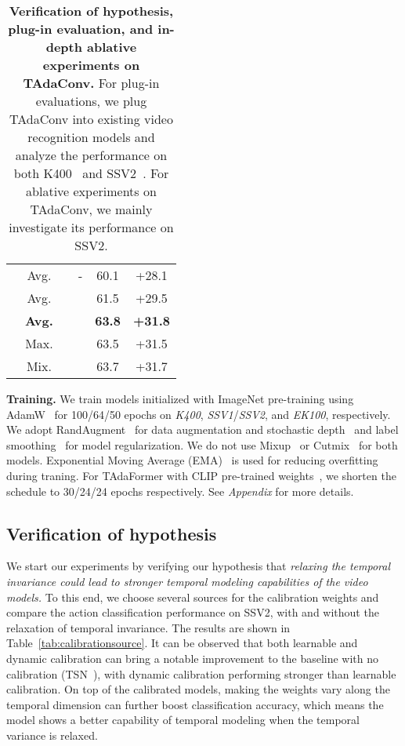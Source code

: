\documentclass[10pt,journal,compsoc]{IEEEtran}
\newcommand{\cmark}{\color{good}\ding{51}}\newcommand{\xmark}{\color{bad}\ding{55}}
\newcommand\graycell[0]{\cellcolor{midgrey}}
\begin{document}
\begin{table*}[]
\begin{subtable}[t]{.48\linewidth}
{\begin{tabular}{cccccc}
    \midrule
    \cmark & Avg. & \xmark & - & 60.1 & +28.1 \\
    \cmark & Avg. & \cmark & \xmark & 61.5 & +29.5\\
    \graycell\cmark & \graycell \bf Avg. & \graycell\cmark & \graycell\cmark & \graycell\bf63.8 & \bf \graycell+31.8 \\
    \midrule
    \cmark & Max. & \cmark & \cmark & 63.5 & +31.5 \\
    \cmark & Mix. & \cmark & \cmark & 63.7 & +31.7\\
    \bottomrule
    \end{tabular}}
    \label{tab:featureaggregation}
\end{subtable}
    \vspace{-3mm}
    \caption{\textbf{Verification of hypothesis, plug-in evaluation, and in-depth ablative experiments on TAdaConv.} For plug-in evaluations, we plug TAdaConv into existing video recognition models and analyze the performance on both K400~\cite{kinetics400} and SSV2~\cite{ssv2}. For ablative experiments on TAdaConv, we mainly investigate its performance on SSV2. }
    \label{tab:ablative_experiments_tadaconv}
\end{table*}

\textbf{Training. }We train models initialized with ImageNet pre-training using AdamW~\cite{adamw} for 100/64/50 epochs on \textit{K400}, \textit{SSV1}/\textit{SSV2}, and \textit{EK100}, respectively. We adopt RandAugment~\cite{randaugment} for data augmentation and stochastic depth~\cite{huang2016droppath} and label smoothing~\cite{szegedy2016inceptionv3} for model regularization. 
We do not use Mixup~\cite{mixup} or Cutmix~\cite{cutmix} for both models. 
Exponential Moving Average (EMA)~\cite{polyak1992ema} is used for reducing overfitting during traning. For TAdaFormer with CLIP pre-trained weights~\cite{radford2021clip}, we shorten the schedule to 30/24/24 epochs respectively. See \textit{Appendix} for more details.


\subsection{Verification of hypothesis}
We start our experiments by verifying our hypothesis that \textit{relaxing the temporal invariance could lead to stronger temporal modeling capabilities of the video models.} To this end, we choose several sources for the calibration weights and compare the action classification performance on SSV2, with and without the relaxation of temporal invariance. The results are shown in Table~\ref{tab:calibrationsource}. 
It can be observed that both learnable and dynamic calibration can bring a notable improvement to the baseline with no calibration (TSN~\cite{tsn}), with dynamic calibration performing stronger than learnable calibration. On top of the calibrated models, making the weights vary along the temporal dimension can further boost classification accuracy, which means the model shows a better capability of temporal modeling when the temporal variance is relaxed. 
\end{document}
